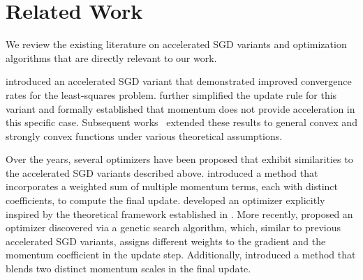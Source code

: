 \section{Related Work}
We review the existing literature on accelerated SGD variants and optimization algorithms that are directly relevant to our work.

\citet{jain18accelerate} introduced an accelerated SGD variant that demonstrated improved convergence rates for the least-squares problem. \citet{kidambi2018on} further simplified the update rule for this variant and formally established that momentum does not provide acceleration in this specific case. Subsequent works~\citep{Liu2020Accelerating, vaswaniconvergence, agnes} extended these results to general convex and strongly convex functions under various theoretical assumptions.

Over the years, several optimizers have been proposed that exhibit similarities to the accelerated SGD variants described above. \citet{lucas2018aggregated} introduced a method that incorporates a weighted sum of multiple momentum terms, each with distinct coefficients, to compute the final update. \citet{ma2018quasihyperbolic} developed an optimizer explicitly inspired by the theoretical framework established in \citet{jain18accelerate}. More recently, \citet{lion} proposed an optimizer discovered via a genetic search algorithm, which, similar to previous accelerated SGD variants, assigns different weights to the gradient and the momentum coefficient in the update step. Additionally, \citet{ademamix} introduced a method that blends two distinct momentum scales in the final update.